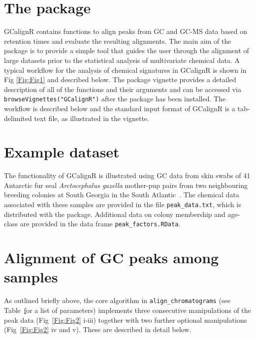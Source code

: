 \documentclass[10pt,letterpaper]{article}
\begin{document}
\section*{The package}
GCalignR contains functions to align peaks from GC and GC-MS data based on retention times and evaluate the resulting alignments. The main aim of the package is to provide a simple tool that guides the user through the alignment of large datasets prior to the statistical analysis of multivariate chemical data. A typical workflow for the analysis of chemical signatures in GCalignR is shown in Fig \ref{Fig:Fig1} and described below. The package vignette provides a detailed description of all of the functions and their arguments and can be accessed via \texttt{browseVignettes("GCalignR")} after the package has been installed. The workflow is described below and the standard input format of GCalignR is a tab-delimited text file, as illustrated in the vignette.

\section*{Example dataset}
The functionality of GCalignR is illustrated using GC data from skin swabs of 41 Antarctic fur seal \textit{Arctocephalus gazella} mother-pup pairs from two neighbouring breeding colonies at South Georgia in the South Atlantic~\cite{Stoffel.2015}. The chemical data associated with these samples are provided in the file \texttt{peak\_data.txt}, which is distributed with the package. Additional data on colony membership and age-class are provided in the data frame \texttt{peak\_factors.RData}.

\section*{Alignment of GC peaks among samples}
As outlined briefly above, the core algorithm in \texttt{align\_chromatograms} (see Table~\href{table:table1} for a list of parameters) implements three consecutive manipulations of the peak data (Fig~\ref{Fig:Fig2} i-iii) together with two further optional manipulations (Fig~\ref{Fig:Fig2} iv and v). These are described in detail below.
\end{document}
